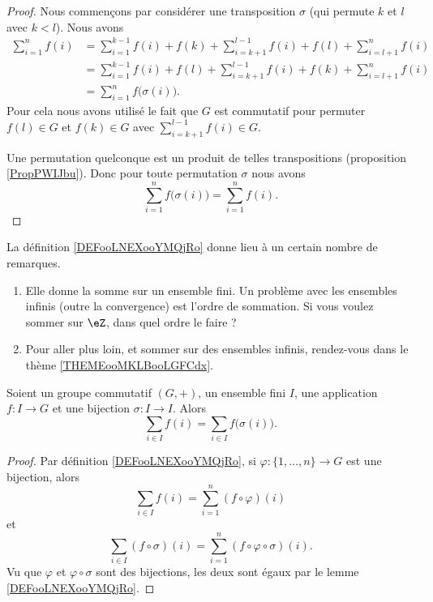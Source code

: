 \begin{proof}
	Nous commençons par considérer une transposition \( \sigma\) (qui permute \( k\) et \( l\) avec \( k<l\)). Nous avons
	\begin{subequations}
		\begin{align}
			\sum_{i=1}^nf(i) & =\sum_{i=1}^{k-1}f(i)+f(k)+\sum_{i=k+1}^{l-1}f(i)+f(l)+\sum_{i=l+1}^nf(i) \\
			                 & =\sum_{i=1}^{k-1}f(i)+f(l)+\sum_{i=k+1}^{l-1}f(i)+f(k)+\sum_{i=l+1}^nf(i) \\
			                 & =\sum_{i=1}^nf\big( \sigma(i) \big).
		\end{align}
	\end{subequations}
	Pour cela nous avons utilisé le fait que \( G\) est commutatif pour permuter \( f(l)\in G\) et \( f(k)\in G\) avec \( \sum_{i=k+1}^{l-1}f(i)\in G\).

	Une permutation quelconque est un produit de telles transpositions (proposition \ref{PropPWIJbu}). Donc pour toute permutation \( \sigma\) nous avons
	\begin{equation}
		\sum_{i=1}^nf\big( \sigma(i) \big)=\sum_{i=1}^nf(i).
	\end{equation}
\end{proof}

La définition \ref{DEFooLNEXooYMQjRo} donne lieu à un certain nombre de remarques.
\begin{enumerate}
	\item
	      Elle donne la somme sur un ensemble fini. Un problème avec les ensembles infinis (outre la convergence) est l'ordre de sommation. Si vous voulez sommer sur \( \eZ\), dans quel ordre le faire ?
	\item
	      Pour aller plus loin, et sommer sur des ensembles infinis, rendez-vous dans le thème \ref{THEMEooMKLBooLGFCdx}.
\end{enumerate}

\begin{proposition}     \label{PROPooJBQVooNqWErk}
	Soient un groupe commutatif \( (G,+)\), un ensemble fini \( I\), une application \( f\colon I\to G\) et une bijection \( \sigma\colon I\to I\). Alors
	\begin{equation}
		\sum_{i\in I}f(i)=\sum_{i\in I}f\big( \sigma(i) \big).
	\end{equation}
\end{proposition}

\begin{proof}
	Par définition \ref{DEFooLNEXooYMQjRo}, si \(\varphi \colon \{ 1,\ldots,n \}\to G  \) est une bijection, alors
	\begin{equation}
		\sum_{i\in I}f(i)=\sum_{i=1}^n(f\circ\varphi)(i)
	\end{equation}
	et
	\begin{equation}
		\sum_{i\in I}(f\circ\sigma)(i)=\sum_{i=1}^n(f\circ\varphi\circ \sigma)(i).
	\end{equation}
	Vu que \( \varphi\) et \( \varphi\circ\sigma\) sont des bijections, les deux sont égaux par le lemme \ref{DEFooLNEXooYMQjRo}.
\end{proof}

